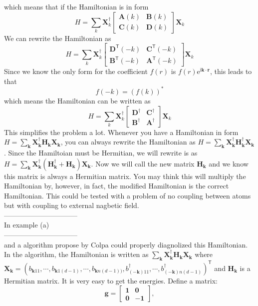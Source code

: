 \documentclass[letter]{article}
\newcommand{\e}{\mathrm{e}}
\newcommand{\ii}{\mathrm{i}}
\begin{document}
which means that if the Hamiltonian is in form$$
H=\sum_{k}\mathbf{X}^{\dagger}_{k}\begin{bmatrix}
    \mathbf{A}(k) & \mathbf{B}(k) \\
    \mathbf{C}(k) & \mathbf{D}(k) 
\end{bmatrix}\mathbf{X}_{k}
$$
We can rewrite the Hamiltonian as
$$
H=\sum_{k}\mathbf{X}^{\dagger}_{k}\begin{bmatrix}
    \mathbf{D}^{\mathsf{T}}(-k) & \mathbf{C}^{\mathsf{T}}(-k) \\
    \mathbf{B}^{\mathsf{T}}(-k) & \mathbf{A}^{\mathsf{T}}(-k) 
\end{bmatrix}\mathbf{X}_{k}
$$
Since we know the only form for the coefficient $f(r)$ is $f(r)\e^{\ii \bm{k}\cdot \bm{r}}$, this leads to that $$
f(-k)=\left(f(k)\right)^*
$$
which means the Hamiltonian can be written as 
$$
H=\sum_{k}\mathbf{X}^{\dagger}_{k}\begin{bmatrix}
    \mathbf{D}^{\dagger} & \mathbf{C}^{\dagger} \\
    \mathbf{B}^{\dagger} & \mathbf{A}^{\dagger}
\end{bmatrix}\mathbf{X}_{k}
$$
This simplifies the problem a lot. Whenever you have a Hamiltonian in form $H=\sum_{\bm{k}}\mathbf{X}^{\dagger}_{\bm{k}}\mathbf{H}_{\bm{k}}\mathbf{X}_{\bm{k}}$, you can always rewrite the Hamiltonian as $H=\sum_{\bm{k}}\mathbf{X}^{\dagger}_{\bm{k}}\mathbf{H}_{\bm{k}}^{\dagger}\mathbf{X}_{\bm{k}}$. Since the Hamiltoian must be Hermitian, we will rewrite is as $H=\sum_{\bm{k}}\mathbf{X}^{\dagger}_{\bm{k}}\left(\mathbf{H}_{\bm{k}}^{\dagger}+\mathbf{H}_{\bm{k}}\right)\mathbf{X}_{\bm{k}}$. Now we will call the new matrix $\mathbf{H}_{\bm{k}}$ and we know this matrix is always a Hermitian matrix. You may think this will multiply the Hamiltonian by, however, in fact, the modified Hamiltonian is the correct Hamiltonian. This could be tested with a problem of no coupling between atoms but with coupling to external nagbetic field. \\
--------------------------------\\
In example (a)\\
--------------------------------\\
and a algorithm propose by Colpa could properly diagnolized this Hamiltonian. In the algorithm, the Hamiltonian is written as $\sum_{\bm{k}}\mathbf{X}^{\dagger}_{\bm{k}}\mathbf{H}_{\bm{k}}\mathbf{X}_{\bm{k}}$ where $\mathbf{X}_{\bm{k}}=\left(b_{\bm{k}11},\cdots,b_{\bm{k}1(d-1)},\cdots,b_{\bm{k}n(d-1))},b_{(-\bm{k})11}^{\dagger},\cdots,b_{(-\bm{k})n(d-1)}^{\dagger}\right)^{\mathsf{T}}$ and $\mathbf{H}_{\bm{k}}$ is a Hermitian matrix. It is very easy to get the energies. Define a matrix:$$
\mathbf{g}=\begin{bmatrix}
    \mathbf{1} & \mathbf{0}  \\
    \mathbf{0} &  -\mathbf{1}
    \end{bmatrix},
$$
\end{document}
